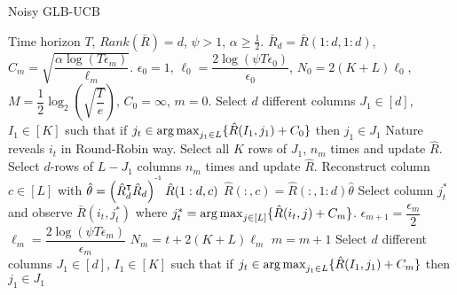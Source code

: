 \begin{algorithm}[!th]
\caption{Noisy GLB-UCB}
\label{alg:NSGLB}
\begin{algorithmic}
 Time horizon $T$, $Rank(\bar{R}) = d$, $\psi >1$, $\alpha\geq\frac{1}{2}$.
 $\bar{R}_d = \bar{R}(1:d,1:d)$, $C_m = \sqrt{\dfrac{\alpha\log(T\epsilon_m)}{\ell_m}}$.
 $\epsilon_0 = 1$, $\ell_0 = \dfrac{2\log(\psi T\epsilon_0)}{\epsilon_0}$, $N_0 = 2(K+L)\ell_0$, $M=\dfrac{1}{2}\log_2\left(\sqrt{\dfrac{T}{e}}\right)$, $C_0 = \infty$, $m=0$.
\State Select $d$ different columns $J_1\in [d]$, $I_1\in [K]$ such that if $j_t\in \mathop{\rm arg\,max}_{j_1\in L}\lbrace \hat{R}(I_1,j_1) + C_0\rbrace$ then $j_1\in J_1$
\State Nature reveals $i_t$ in Round-Robin way.
\Explore
\State Select all $K$ rows of $J_1$, $n_m$ times and update $\hat{R}$.
\State Select $d$-rows of $L - J_1$ columns $n_m$ times and update $\hat{R}$.
\EndExplore
\ColRec
\State Reconstruct column $c\in[L]$ with $\hat{\theta} = \left(\hat{R}_d^{\intercal}\hat{R}_d\right)^{^{\text{-}1}}\hat{R}(1:d,c) $
\State $\hat{R}(:,c) =  \hat{R}(:,1:d)\hat{\theta}$
\EndColRec
\State {}
\Exploit
\State Select column $j_t^*$ and observe $\bar{R}(i_t,j_t^*)$ where $j_t^* = \mathop{\rm arg\,max}_{j\in[L]} \lbrace\hat{R}(i_t,j) + C_m\rbrace$.
\EndExploit
\EndIf
\State {}
\ResParam
\State $\epsilon_{m+1} = \dfrac{\epsilon_m}{2}$
\State $\ell_m = \dfrac{2\log(\psi T\epsilon_m)}{\epsilon_m}$
\State $N_m = t +  2(K+L)\ell_m$
\State $m = m + 1$
\State Select $d$ different columns $J_1\in [d]$, $I_1\in [K]$ such that if $j_t\in \mathop{\rm arg\,max}_{j_1\in L}\lbrace \hat{R}(I_1,j_1) + C_m\rbrace$ then $j_1\in J_1$
\EndResParam
\EndIf
\EndFor
\end{algorithmic}
\end{algorithm}